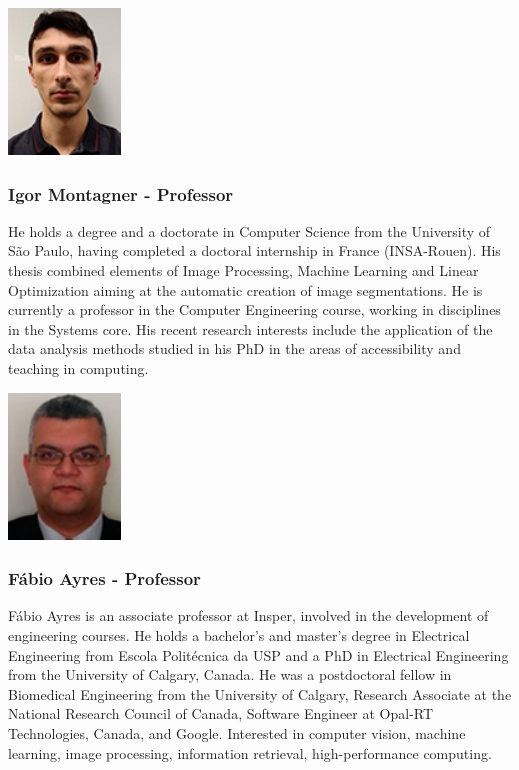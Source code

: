 \begin{multicols}{2}
\includegraphics[width=3cm]{imgs/Igor-dos-Santos-Montagner.jpg}
\columnbreak
\subsubsection{Igor Montagner - Professor}
He holds a degree and a doctorate in Computer Science from the University of São Paulo, having completed a doctoral internship in France (INSA-Rouen). His thesis combined elements of Image Processing, Machine Learning and Linear Optimization aiming at the automatic creation of image segmentations. He is currently a professor in the Computer Engineering course, working in disciplines in the Systems core. His recent research interests include the application of the data analysis methods studied in his PhD in the areas of accessibility and teaching in computing.
\end{multicols}

\begin{multicols}{2}
\includegraphics[width=3cm]{imgs/fabio-ayres.png}
\columnbreak
\subsubsection{Fábio Ayres - Professor}
Fábio Ayres is an associate professor at Insper, involved in the development of engineering courses. He holds a bachelor's and master's degree in Electrical Engineering from Escola Politécnica da USP and a PhD in Electrical Engineering from the University of Calgary, Canada. He was a postdoctoral fellow in Biomedical Engineering from the University of Calgary, Research Associate at the National Research Council of Canada, Software Engineer at Opal-RT Technologies, Canada, and Google. Interested in computer vision, machine learning, image processing, information retrieval, high-performance computing.
\end{multicols}

